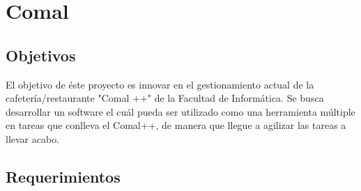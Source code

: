 \documentclass[a4paper,12pt]{article}
\begin{document}
	\section{Comal}
	\subsection{Objetivos}
	El objetivo de éste proyecto es innovar en el gestionamiento actual de la cafetería/restaurante "Comal ++" de la Facultad de Informática. Se busca desarrollar un software el cuál pueda ser utilizado como una herramienta múltiple en tareas que conlleva el Comal++, de manera que llegue a agilizar las tareas a llevar acabo.
	\subsection{Requerimientos}
\end{document}
